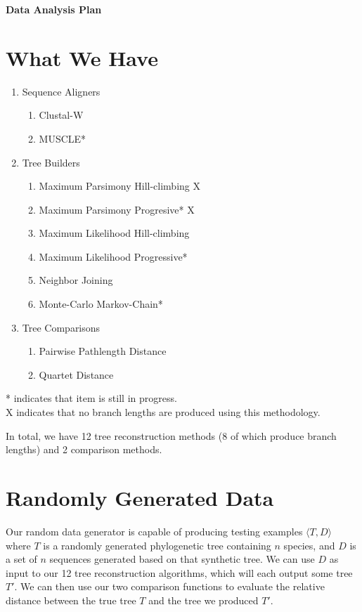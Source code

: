 \documentclass[11pt]{article}
\begin{document}
\noindent
{\Large\textbf{Data Analysis Plan}}\\

\section*{What We Have}

\begin{enumerate}
\item
  Sequence Aligners
  \begin{enumerate}
    \item Clustal-W
    \item MUSCLE*
  \end{enumerate}
\item
  Tree Builders
  \begin{enumerate}
    \item Maximum Parsimony Hill-climbing X
    \item Maximum Parsimony Progresive* X
    \item Maximum Likelihood Hill-climbing
    \item Maximum Likelihood Progressive*
    \item Neighbor Joining
    \item Monte-Carlo Markov-Chain*
  \end{enumerate}
\item
  Tree Comparisons
  \begin{enumerate}
    \item Pairwise Pathlength Distance
    \item Quartet Distance
  \end{enumerate}
\end{enumerate}
* indicates that item is still in progress. \\
X indicates that no branch lengths are produced using this methodology.\bigskip

In total, we have 12 tree reconstruction methods (8 of which produce branch lengths)
and 2 comparison methods.

\section*{Randomly Generated Data}
Our random data generator is capable of producing testing examples $\langle T, D \rangle$ where
$T$ is a randomly generated phylogenetic tree containing $n$ species, and $D$ is a set of $n$ 
sequences generated based on that synthetic tree. We can use $D$ as input to our 12 tree
reconstruction algorithms, which will each output some tree $T'$. We can then use our two comparison
functions to evaluate the relative distance between the true tree $T$ and the tree we produced
$T'$.\bigskip
\end{document}
